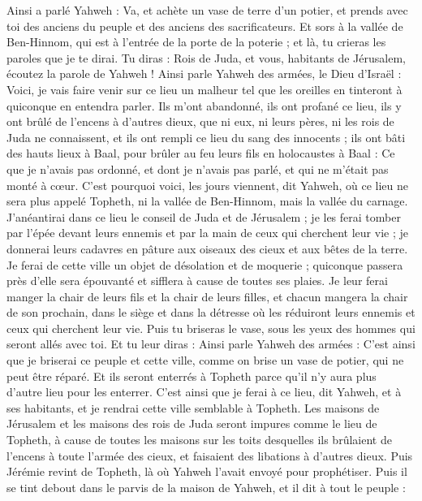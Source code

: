 \begin{multicols}{2}
\VerseOne{}Ainsi a parlé Yahweh : Va, et achète un vase de terre d'un potier, et prends avec toi des anciens du peuple et des anciens des sacrificateurs.
Et sors à la vallée de Ben-Hinnom, qui est à l'entrée de la porte de la poterie ; et là, tu crieras les paroles que je te dirai.
Tu diras : Rois de Juda, et vous, habitants de Jérusalem, écoutez la parole de Yahweh ! Ainsi parle Yahweh des armées, le Dieu d'Israël : Voici, je vais faire venir sur ce lieu un malheur tel que les oreilles en tinteront à quiconque en entendra parler.
Ils m'ont abandonné, ils ont profané ce lieu, ils y ont brûlé de l’encens à d'autres dieux, que ni eux, ni leurs pères, ni les rois de Juda ne connaissent, et ils ont rempli ce lieu du sang des innocents ;
ils ont bâti des hauts lieux à Baal, pour brûler au feu leurs fils en holocaustes à Baal : Ce que je n'avais pas ordonné, et dont je n'avais pas parlé, et qui ne m’était pas monté à cœur.
C’est pourquoi voici, les jours viennent, dit Yahweh, où ce lieu ne sera plus appelé Topheth, ni la vallée de Ben-Hinnom, mais la vallée du carnage.
J’anéantirai dans ce lieu le conseil de Juda et de Jérusalem ; je les ferai tomber par l'épée devant leurs ennemis et par la main de ceux qui cherchent leur vie ; je donnerai leurs cadavres en pâture aux oiseaux des cieux et aux bêtes de la terre.
Je ferai de cette ville un objet de désolation et de moquerie ; quiconque passera près d'elle sera épouvanté et sifflera à cause de toutes ses plaies.
Je leur ferai manger la chair de leurs fils et la chair de leurs filles, et chacun mangera la chair de son prochain, dans le siège et dans la détresse où les réduiront leurs ennemis et ceux qui cherchent leur vie.
Puis tu briseras le vase, sous les yeux des hommes qui seront allés avec toi.
Et tu leur diras : Ainsi parle Yahweh des armées : C’est ainsi que je briserai ce peuple et cette ville, comme on brise un vase de potier, qui ne peut être réparé. Et ils seront enterrés à Topheth parce qu'il n'y aura plus d'autre lieu pour les enterrer.
C’est ainsi que je ferai à ce lieu, dit Yahweh, et à ses habitants, et je rendrai cette ville semblable à Topheth.
Les maisons de Jérusalem et les maisons des rois de Juda seront impures comme le lieu de Topheth, à cause de toutes les maisons sur les toits desquelles ils brûlaient de l’encens à toute l'armée des cieux, et faisaient des libations à d'autres dieux.
Puis Jérémie revint de Topheth, là où Yahweh l'avait envoyé pour prophétiser. Puis il se tint debout dans le parvis de la maison de Yahweh, et il dit à tout le peuple :

\end{multicols}
